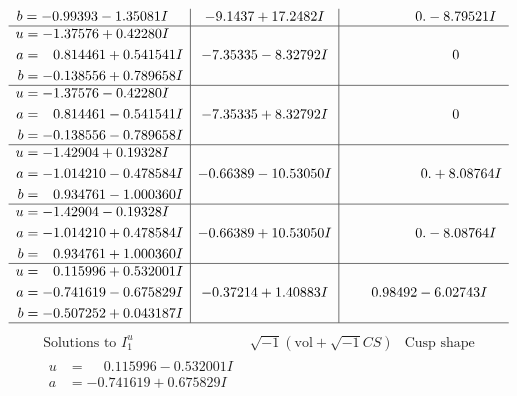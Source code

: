 \documentclass[1p]{elsarticle_modified}
\theoremstyle{definition}
\newcommand{\I}{\sqrt{-1}}
\begin{document}
$$\begin{array}{c|c|c}
\begin{aligned}
b &= -0.99393 - 1.35081 I\end{aligned}
 & -9.1437 + 17.2482 I & \phantom{-0.000000 } 0. - 8.79521 I \\ \hline\begin{aligned}
u &= -1.37576 + 0.42280 I \\
a &= \phantom{-}0.814461 + 0.541541 I \\
b &= -0.138556 + 0.789658 I\end{aligned}
 & -7.35335 - 8.32792 I & \phantom{-0.000000 } 0 \\ \hline\begin{aligned}
u &= -1.37576 - 0.42280 I \\
a &= \phantom{-}0.814461 - 0.541541 I \\
b &= -0.138556 - 0.789658 I\end{aligned}
 & -7.35335 + 8.32792 I & \phantom{-0.000000 } 0 \\ \hline\begin{aligned}
u &= -1.42904 + 0.19328 I \\
a &= -1.014210 - 0.478584 I \\
b &= \phantom{-}0.934761 - 1.000360 I\end{aligned}
 & -0.66389 - 10.53050 I & \phantom{-0.000000 -}0. + 8.08764 I \\ \hline\begin{aligned}
u &= -1.42904 - 0.19328 I \\
a &= -1.014210 + 0.478584 I \\
b &= \phantom{-}0.934761 + 1.000360 I\end{aligned}
 & -0.66389 + 10.53050 I & \phantom{-0.000000 } 0. - 8.08764 I \\ \hline\begin{aligned}
u &= \phantom{-}0.115996 + 0.532001 I \\
a &= -0.741619 - 0.675829 I \\
b &= -0.507252 + 0.043187 I\end{aligned}
 & -0.37214 + 1.40883 I & \phantom{-}0.98492 - 6.02743 I\\
 \hline 
 \end{array}$$\newpage$$\begin{array}{c|c|c}  
\text{Solutions to }I^u_{1}& \I (\text{vol} + \sqrt{-1}CS) & \text{Cusp shape}\\
 \hline 
\begin{aligned}
u &= \phantom{-}0.115996 - 0.532001 I \\
a &= -0.741619 + 0.675829 I \\

\end{aligned}
\end{array}$$
\end{document}
